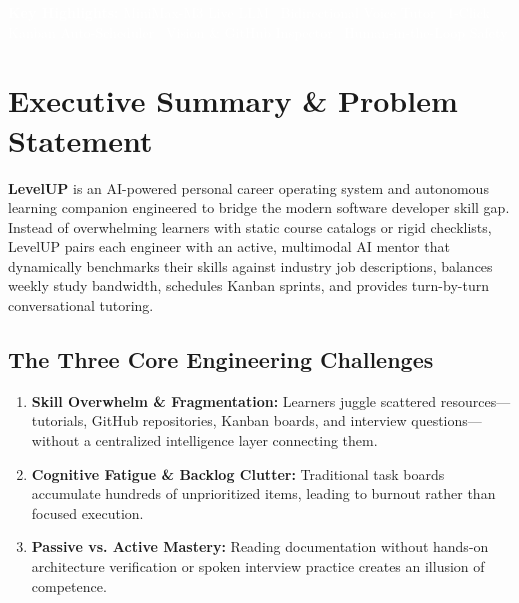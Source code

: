 ﻿\documentclass[11pt,a4paper]{article}
\begin{document}
\begin{titlepage}
    \vfill
    \begin{tcolorbox}[colback=darkObsidian,colframe=darkObsidian,arc=1mm]
    \centering
    \textcolor{white}{\small \textbf{Key Highlights:} MiniMax-M3 Live LLM \textbar\ Bidirectional Voice Tutor \textbar\ 1-Click Kanban Auto-Scheduler \textbar\ Vision \& GitHub Inspector \textbar\ Human-in-the-Loop Safety}
    \end{tcolorbox}
\end{titlepage}

\tableofcontents
\newpage

\section{Executive Summary \& Problem Statement}

\textbf{LevelUP} is an AI-powered personal career operating system and autonomous learning companion engineered to bridge the modern software developer skill gap. Instead of overwhelming learners with static course catalogs or rigid checklists, LevelUP pairs each engineer with an active, multimodal AI mentor that dynamically benchmarks their skills against industry job descriptions, balances weekly study bandwidth, schedules Kanban sprints, and provides turn-by-turn conversational tutoring.

\subsection{The Three Core Engineering Challenges}
\begin{enumerate}[leftmargin=1.5em]
    \item \textbf{Skill Overwhelm \& Fragmentation:} Learners juggle scattered resources---tutorials, GitHub repositories, Kanban boards, and interview questions---without a centralized intelligence layer connecting them.
    \item \textbf{Cognitive Fatigue \& Backlog Clutter:} Traditional task boards accumulate hundreds of unprioritized items, leading to burnout rather than focused execution.
    \item \textbf{Passive vs. Active Mastery:} Reading documentation without hands-on architecture verification or spoken interview practice creates an illusion of competence.
\end{enumerate}
\end{document}
